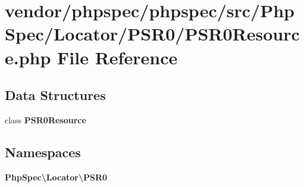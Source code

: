 \section{vendor/phpspec/phpspec/src/\+Php\+Spec/\+Locator/\+P\+S\+R0/\+P\+S\+R0\+Resource.php File Reference}
\label{_p_s_r0_resource_8php}
\subsection*{Data Structures}
\begin{DoxyCompactItemize}
\item 
class {\bf P\+S\+R0\+Resource}
\end{DoxyCompactItemize}
\subsection*{Namespaces}
\begin{DoxyCompactItemize}
\item 
 {\bf Php\+Spec\textbackslash{}\+Locator\textbackslash{}\+P\+S\+R0}
\end{DoxyCompactItemize}

